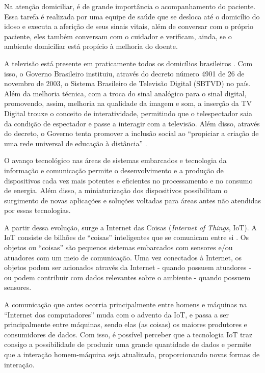 Na atenção domiciliar, é de grande importância o acompanhamento do paciente.
Essa tarefa é realizada por uma equipe de saúde que se desloca até o domicílio do
idoso e executa a aferição de seus sinais vitais, além de conversar com o
próprio paciente, eles também conversam com o cuidador e verificam, ainda, se o
ambiente domiciliar está propício à melhoria do doente.

A televisão está presente em praticamente todos os  domicílios brasileiros \cite{ibge2015tv}. 
Com isso, o Governo Brasileiro instituiu, através do decreto número 4901 de 26 de
novembro de 2003, o Sistema Brasileiro de Televisão Digital (SBTVD) no país.
Além da melhoria técnica, com a troca do sinal analógico para o sinal  digital,
promovendo, assim, melhoria na qualidade da imagem e som, a inserção  da TV
Digital trouxe o conceito de interatividade, permitindo que o  telespectador
saia da condição de espectador e passe a interagir com a  televisão. Além disso,
através do decreto, o Governo tenta promover a inclusão social ao ``propiciar a
criação de uma rede universal de educação à distância''
\cite{digitaltv2015decree}.

O avanço tecnológico nas áreas de sistemas embarcados e tecnologia da informação
e comunicação permite o desenvolvimento e a produção de dispositivos cada vez
mais potentes e eficientes no processamento e no consumo de energia. Além disso,
a miniaturização dos dispositivos possibilitam o surgimento de novas aplicações
e soluções voltadas para áreas antes não atendidas por essas tecnologias.

A partir dessa evolução, surge a Internet das Coisas (\textit{Internet of Things},
IoT). A IoT consiste de bilhões de ``coisas'' inteligentes que se comunicam entre
si \cite{li2015internet}. Os objetos ou ``coisas'' são pequenos sistemas embarcados
com sensores e/ou atuadores com um meio de comunicação. Uma vez conectados à Internet, 
os objetos podem ser acionados através da Internet - quando possuem atuadores - ou
podem contribuir com dados relevantes sobre o ambiente - quando possuem sensores.

A comunicação que antes ocorria principalmente entre homens e máquinas na ``Internet
dos computadores'' muda com o advento da IoT, e passa a ser principalmente entre
máquinas, sendo elas (as coisas) os maiores produtores e consumidores de dados.
Com isso, é possível perceber que a tecnologia IoT traz consigo a possibilidade de
produzir uma grande quantidade de dados e permite que a interação homem-máquina
seja atualizada, proporcionando novas formas de interação.

